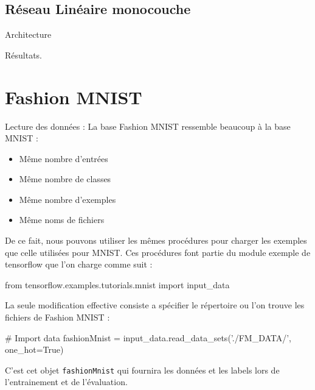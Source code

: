 \documentclass[a4paper,11pt]{book}
\theoremstyle{theo}
\begin{document}
\subsection{Réseau Linéaire monocouche}
\label{secMnistMono}
Architecture

Résultats.

\section{Fashion MNIST}
Lecture des données :
La base Fashion MNIST ressemble beaucoup à la base MNIST :
\begin{itemize}
\item Même nombre d'entrées
\item Même nombre de classes
\item Même nombre d'exemples
\item Même noms de fichiers
\end{itemize}
De ce fait, nous pouvons utiliser les mêmes procédures pour charger les exemples que celle utilisées pour MNIST. Ces procédures font partie du module exemple de tensorflow que l'on charge comme suit :
\begin{mypython}
from tensorflow.examples.tutorials.mnist import input_data
\end{mypython}
La seule modification effective consiste a spécifier le répertoire ou l'on trouve les fichiers de Fashion MNIST :

\begin{mypython}
# Import data
fashionMnist = input_data.read_data_sets('./FM_DATA/', one_hot=True)
\end{mypython}
C'est cet objet \verb+fashionMnist+ qui fournira les données et les labels lors de l'entrainement et de l'évaluation.
\end{document}
